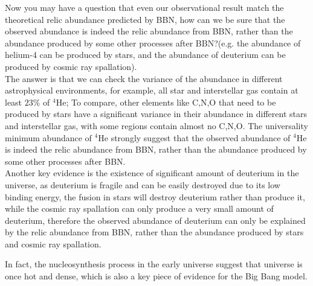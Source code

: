 \bigskip \noindent 
\begin{intuition}
    Now you may have a question that even our observational result match the theoretical relic abundance predicted by BBN, how can we be sure that the observed abundance is indeed the relic abundance from BBN, rather than the abundance produced by some other processes after BBN?(e.g. the abundance of helium-4 can be produced by stars, and the abundance of deuterium can be produced by cosmic ray spallation). \\

    The answer is that we can check the variance of the abundance in different astrophysical environments, for example, all star and interstellar gas contain at least $23\%$ of ${}^4\text{He}$; To compare, other elements like C,N,O that need to be produced by stars have a significant variance in their abundance in different stars and interstellar gas, with some regions contain almost no C,N,O. The universality minimum abundance of ${}^4\text{He}$ strongly suggest that the observed abundance of ${}^4\text{He}$ is indeed the relic abundance from BBN, rather than the abundance produced by some other processes after BBN. \\

    Another key evidence is the existence of significant amount of deuterium in the universe, as deuterium is fragile and can be easily destroyed due to its low binding energy, the fusion in stars will destroy deuterium rather than produce it, while the cosmic ray spallation can only produce a very small amount of deuterium, therefore the observed abundance of deuterium can only be explained by the relic abundance from BBN, rather than the abundance produced by stars and cosmic ray spallation.
\end{intuition}

\bigskip \noindent
\begin{remark}
    In fact, the nucleosynthesis process in the early universe suggest that universe is once hot and dense, which is also a key piece of evidence for the Big Bang model. 
\end{remark}

